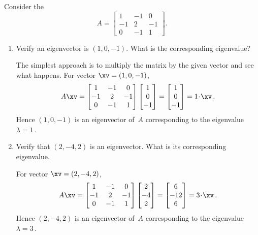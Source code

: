 \begin{example} \label{eg:eig3intro}
Consider the 
\begin{equation*}
A=\begin{bmatrix} 1&-1&0\\-1&2&-1\\0&-1&1 \end{bmatrix}.
\end{equation*}
\begin{enumerate}
\item Verify an eigenvector is \((1,0,-1)\).  
What is the corresponding eigenvalue?
\begin{solution} 
The simplest approach is to multiply the matrix by the given vector and see what happens.
For vector \(\xv=(1,0,-1)\),
\begin{equation*}
A\xv=\begin{bmatrix} 1&-1&0\\-1&2&-1\\0&-1&1 \end{bmatrix}
\begin{bmatrix} 1\\0\\-1 \end{bmatrix}
=\begin{bmatrix} 1\\0\\-1  \end{bmatrix}
=1\cdot\xv\,.
\end{equation*}
Hence \((1,0,-1)\) is an eigenvector of~\(A\) corresponding to the eigenvalue \(\lambda=1\)\,. 
\end{solution}

\item Verify that \((2,-4,2)\) is an eigenvector.  
What is its corresponding eigenvalue.
\begin{solution} 
For vector \(\xv=(2,-4,2)\),
\begin{equation*}
A\xv=\begin{bmatrix} 1&-1&0\\-1&2&-1\\0&-1&1 \end{bmatrix}
\begin{bmatrix} 2\\-4\\2 \end{bmatrix}
=\begin{bmatrix} 6\\-12\\6  \end{bmatrix}
=3\cdot\xv\,.
\end{equation*}
Hence \((2,-4,2)\) is an eigenvector of~\(A\) corresponding to the eigenvalue \(\lambda=3\)\,. 
\end{solution}


\end{enumerate}
\end{example}
